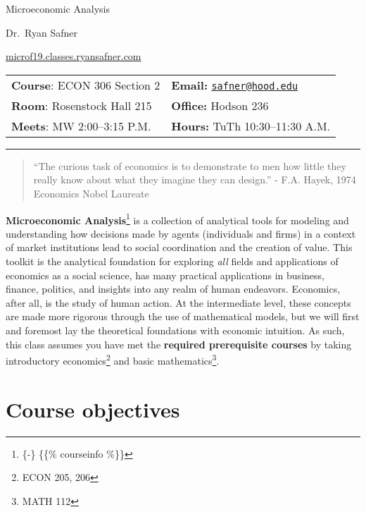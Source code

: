 \documentclass{article}
\begin{document}
\sffamily

\centerline{\Huge Microeconomic Analysis}

\vspace{3 mm}

\centerline{\large Dr.~Ryan Safner}
\vspace{2 mm}
\centerline{\large \href{http://micro.classes.ryansafner.com}{microf19.classes.ryansafner.com}}

\vspace{5 mm}

\begin{tabular}{@{}p{3.5in}p{3.5in}}           
\textbf{Course}: ECON 306 Section 2 & \textbf{Email:}  \href{mailto:safner@hood.edu}{\nolinkurl{safner@hood.edu}}\\
\textbf{Room}: Rosenstock Hall 215 & \textbf{Office:}  Hodson 236\\
\textbf{Meets}: MW 2:00--3:15 P.M. & \textbf{Hours:} TuTh 10:30--11:30 A.M.\\ 
\end{tabular}

\vspace{5 mm}

\hrule


\begin{quote}
``The curious task of economics is to demonstrate to men how little they
really know about what they imagine they can design.'' - F.A. Hayek,
1974 Economics Nobel Laureate
\end{quote}

\textbf{Microeconomic Analysis}\footnote{\{-\} \{\{\% courseinfo \%\}\}}
is a collection of analytical tools for modeling and understanding how
decisions made by agents (individuals and firms) in a context of market
institutions lead to social coordination and the creation of value. This
toolkit is the analytical foundation for exploring \emph{all} fields and
applications of economics as a social science, has many practical
applications in business, finance, politics, and insights into any realm
of human endeavors. Economics, after all, is the study of human action.
At the intermediate level, these concepts are made more rigorous through
the use of mathematical models, but we will first and foremost lay the
theoretical foundations with economic intuition. As such, this class
assumes you have met the \textbf{required prerequisite courses} by
taking introductory economics\footnote{ECON 205, 206} and basic
mathematics\footnote{MATH 112}.

\hypertarget{course-objectives}{%
\section{Course objectives}\label{course-objectives}}
\end{document}
